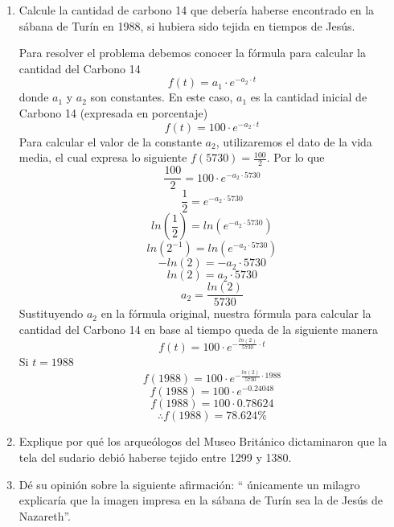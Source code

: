 \documentclass[12pt]{article}
\begin{document}
\begin{enumerate}	
\item Calcule la cantidad de carbono 14 que debería haberse encontrado en la sábana de Turín en 1988, si hubiera sido tejida en tiempos de Jesús.

Para resolver el problema debemos conocer la fórmula para calcular la cantidad del Carbono 14
\[
f(t)=a_1 \cdot e^{-a_2 \cdot t}
\]
donde $a_1$ y $a_2$ son constantes. En este caso, $a_1$ es la cantidad inicial de Carbono 14 (expresada en porcentaje)
\[
f(t)=100 \cdot e^{-a_2 \cdot t}
\]
Para calcular el valor de la constante $a_2$, utilizaremos el dato de la vida media, el cual expresa lo siguiente $f(5730)=\frac{100}{2}$. Por lo que
\[
\frac{100}{2}=100 \cdot e^{-a_2 \cdot 5730}
\]
\[
\frac{1}{2}=e^{-a_2 \cdot 5730}
\]
\[
ln(\frac{1}{2}) = ln ( e^{-a_2 \cdot 5730} )
\]
\[
ln(2^{-1}) = ln ( e^{-a_2 \cdot 5730} )
\]
\[
-ln(2) = -a_2 \cdot 5730
\]
\[
ln(2) = a_2 \cdot 5730
\]
\[
a_2 = \frac{ln(2)}{5730}
\]
Sustituyendo $a_2$ en la fórmula original, nuestra fórmula para calcular la cantidad del Carbono 14 en base al tiempo queda de la siguiente manera
\[
f(t)=100 \cdot e^{-\frac{ln(2)}{5730} \cdot t}
\]
Si $t=1988$
\[
f(1988)=100 \cdot e^{-\frac{ln(2)}{5730} \cdot 1988}
\]
\[
f(1988)=100 \cdot e^{-0.24048}
\]
\[
f(1988)=100 \cdot 0.78624
\]
\[
\therefore f(1988)=78.624\%
\]

\item Explique por qué los arqueólogos del Museo Británico dictaminaron que la tela del sudario debió haberse tejido entre 1299 y 1380.

\item Dé su opinión sobre la siguiente afirmación: “ únicamente un milagro explicaría que la imagen impresa en la sábana de Turín sea la de Jesús de Nazareth”.

\end{enumerate}
\end{document}
